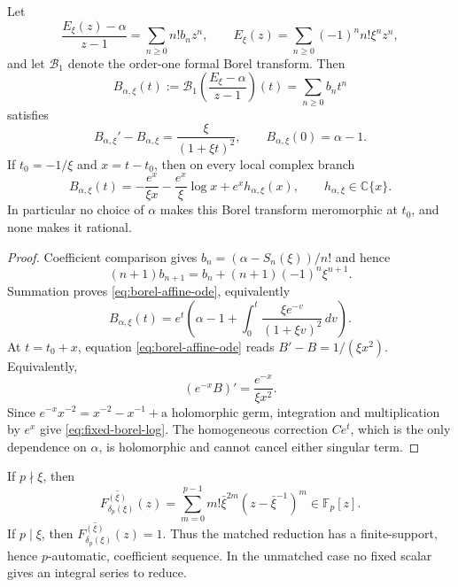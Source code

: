 \begin{proposition}
\label{prop:fixed-borel-logarithm}
Let
\[
 \frac{E_\xi(z)-\alpha}{z-1}=\sum_{n\geq0}n!b_nz^n,
 \qquad
 E_\xi(z)=\sum_{n\geq0}(-1)^nn!\xi^nz^n,
\]
and let $\mathcal B_1$ denote the order-one formal Borel transform.  Then
\[
 B_{\alpha,\xi}(t):=
 \mathcal B_1\!\left(\frac{E_\xi-\alpha}{z-1}\right)(t)
 =\sum_{n\geq0}b_nt^n
\]
satisfies
\begin{equation}
 B_{\alpha,\xi}'-B_{\alpha,\xi}
 =\frac{\xi}{(1+\xi t)^2},
 \qquad B_{\alpha,\xi}(0)=\alpha-1.
\label{eq:borel-affine-ode}
\end{equation}
If $t_0=-1/\xi$ and $x=t-t_0$, then on every local complex branch
\begin{equation}
 B_{\alpha,\xi}(t)
 =-\frac{e^x}{\xi x}-\frac{e^x}{\xi}\log x+e^xh_{\alpha,\xi}(x),
 \qquad h_{\alpha,\xi}\in\mathbb C\{x\}.
\label{eq:fixed-borel-log}
\end{equation}
In particular no choice of $\alpha$ makes this Borel transform meromorphic
at $t_0$, and none makes it rational.
\end{proposition}

\begin{proof}
Coefficient comparison gives
$b_n=(\alpha-S_n(\xi))/n!$ and hence
\[
 (n+1)b_{n+1}=b_n+(n+1)(-1)^n\xi^{n+1}.
\]
Summation proves \eqref{eq:borel-affine-ode}, equivalently
\[
 B_{\alpha,\xi}(t)=e^t\left(
 \alpha-1+\int_0^t\frac{\xi e^{-v}}{(1+\xi v)^2}\,dv\right).
\]
At $t=t_0+x$, equation \eqref{eq:borel-affine-ode} reads
$B'-B=1/(\xi x^2)$.  Equivalently,
\[
 (e^{-x}B)'=\frac{e^{-x}}{\xi x^2}.
\]
Since
$e^{-x}x^{-2}=x^{-2}-x^{-1}+\text{a holomorphic germ}$, integration and
multiplication by $e^x$ give \eqref{eq:fixed-borel-log}.  The homogeneous
correction $Ce^t$, which is the only dependence on $\alpha$, is holomorphic
and cannot cancel either singular term.
\end{proof}

\begin{corollary}
\label{cor:matched-polynomial-reduction}
If $p\nmid\xi$, then
\begin{equation}
 \overline{F_{\delta_p(\xi)}^{(\xi)}}(z)
 =\sum_{m=0}^{p-1}m!\bar\xi^{2m}
       (z-\bar\xi^{-1})^m\in\mathbb F_p[z].
\label{eq:matched-polynomial-mod-p}
\end{equation}
If $p\mid\xi$, then
$\overline{F_{\delta_p(\xi)}^{(\xi)}}(z)=1$.  Thus the matched reduction
has a finite-support, hence $p$-automatic, coefficient sequence.  In the
unmatched case no fixed scalar gives an integral series to reduce.
\end{corollary}

